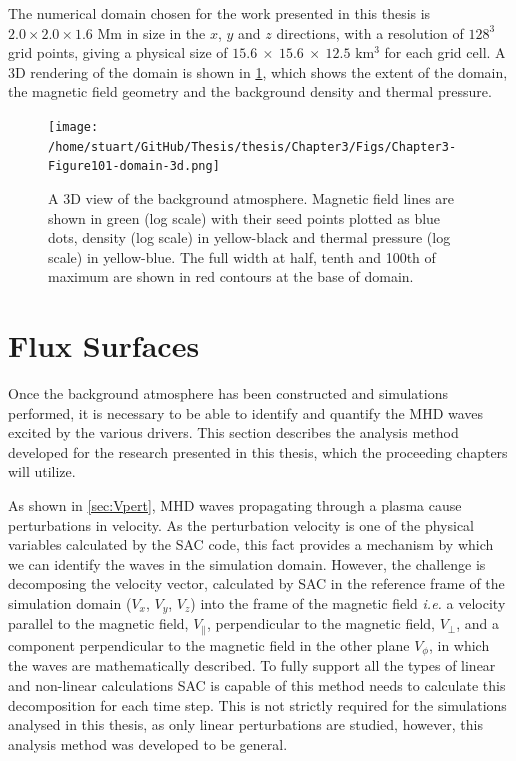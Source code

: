 \documentclass[a4paper,12pt,fourier,authoryear,custommargin]{Classes/PhDThesisPSnPDF}
\begin{document}
The numerical domain chosen for the work presented in this thesis is $2.0 \times 2.0 \times 1.6$ Mm in size in the $x$, $y$ and $z$ directions, with a resolution of $128^3$ grid points, giving a physical size of $15.6\ \times\ 15.6\ \times\ 12.5$ km$^3$ for each grid cell.
A 3D rendering of the domain is shown in \cref{fig:domain-3d}, which shows the extent of the domain, the magnetic field geometry and the background density and thermal pressure.





\begin{figure}[h]
    \centering
    \texttt{[image: /home/stuart/GitHub/Thesis/thesis/Chapter3/Figs/Chapter3-Figure101-domain-3d.png]}
    \caption{A 3D view of the background atmosphere. Magnetic field lines are shown in green (log scale) with their seed points plotted as blue dots, density (log scale) in yellow-black and thermal pressure (log scale) in yellow-blue. The full width at half, tenth and 100th of maximum are shown in red contours at the base of domain.}
    \label{fig:domain-3d}
\end{figure}

\section{Flux Surfaces}\label{sec:fluxsurfaces}

Once the background atmosphere has been constructed and simulations performed, it is necessary to be able to identify and quantify the MHD waves excited by the various drivers.
This section describes the analysis method developed for the research presented in this thesis, which the proceeding chapters will utilize.

As shown in \cref{sec:Vpert}, MHD waves propagating through a plasma cause perturbations in velocity.
As the perturbation velocity is one of the physical variables calculated by the SAC code, this fact provides a mechanism by which we can identify the waves in the simulation domain.
However, the challenge is decomposing the velocity vector, calculated by SAC in the reference frame of the simulation domain ($V_x$, $V_y$, $V_z$) into the frame of the magnetic field \textit{i.e.} a velocity parallel to the magnetic field, $V_\parallel$, perpendicular to the magnetic field, $V_\perp$, and a component perpendicular to the magnetic field in the other plane $V_\phi$, in which the waves are mathematically described.
To fully support all the types of linear and non-linear calculations SAC is capable of this method needs to calculate this decomposition for each time step.
This is not strictly required for the simulations analysed in this thesis, as only linear perturbations are studied, however, this analysis method was developed to be general.
\end{document}

